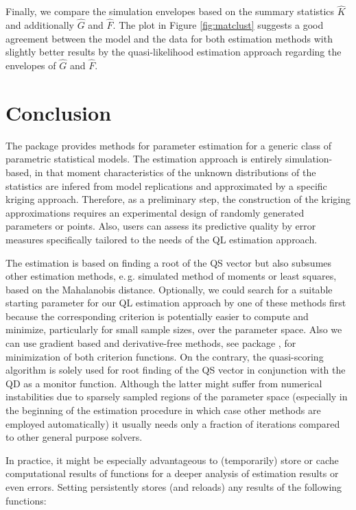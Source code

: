 \documentclass[article, nojss]{jss}
\numberwithin{equation}{section}			%
\begin{document}
%
Finally, we compare the simulation envelopes based on the summary statistics
$\hat{K}$ and additionally $\hat{G}$ and $\hat{F}$. The plot in Figure
\ref{fig:matclust} suggests a good agreement between the model and the data for
both estimation methods with slightly better results by the quasi-likelihood
estimation approach regarding the envelopes of $\hat{G}$ and $\hat{F}$.
\section{Conclusion}\label{sec:conclusion}
The package  provides methods for parameter estimation for
a generic class of parametric statistical models. The estimation
approach is entirely simulation-based, in that moment characteristics of the
unknown distributions of the statistics are infered from model replications and
approximated by a specific kriging approach. Therefore, as a preliminary step,
the construction of the kriging approximations requires an experimental design
of randomly generated parameters or points. Also, users can assess its
predictive quality by error measures specifically tailored to the needs of the QL
estimation approach.\par
%
The estimation is based on finding a root of the QS vector but also subsumes
other estimation methods, e.\,g. simulated method of moments or least squares,
based on the Mahalanobis distance. Optionally, we could search for a suitable
starting parameter for our QL estimation approach by one of these methods first
because the corresponding criterion is potentially easier to compute and
minimize, particularly for small sample sizes, over the parameter space. Also we
can use gradient based and derivative-free methods, see package 
\citep{pkg:nloptr}, for minimization of both criterion functions. On the
contrary, the quasi-scoring algorithm is solely used for root finding of the QS vector
in conjunction with the QD as a monitor function. Although the latter might
suffer from numerical instabilities due to sparsely sampled regions of the parameter space
(especially in the beginning of the estimation procedure in which case other
methods are employed automatically) it usually needs only a fraction of iterations compared
to other general purpose solvers.\par
%
In practice, it might be especially advantageous to (temporarily)
store or cache computational results of functions for a deeper analysis of
estimation results or even errors. Setting 
persistently stores (and reloads) any results of the following functions:
\end{document}
